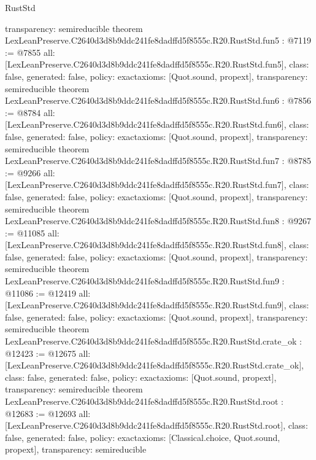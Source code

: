 \begin{lexlean}{RustStd}
\begin{coremodule}
{  transparency: semireducible
}
theorem LexLeanPreserve.C2640d3d8b9ddc241fe8dadffd5f8555c.R20.RustStd.fun5 : @7119 := @7855 {
  all: [LexLeanPreserve.C2640d3d8b9ddc241fe8dadffd5f8555c.R20.RustStd.fun5],
  class: false,
  generated: false,
  policy: exact{axioms: [Quot.sound, propext]},
  transparency: semireducible
}
theorem LexLeanPreserve.C2640d3d8b9ddc241fe8dadffd5f8555c.R20.RustStd.fun6 : @7856 := @8784 {
  all: [LexLeanPreserve.C2640d3d8b9ddc241fe8dadffd5f8555c.R20.RustStd.fun6],
  class: false,
  generated: false,
  policy: exact{axioms: [Quot.sound, propext]},
  transparency: semireducible
}
theorem LexLeanPreserve.C2640d3d8b9ddc241fe8dadffd5f8555c.R20.RustStd.fun7 : @8785 := @9266 {
  all: [LexLeanPreserve.C2640d3d8b9ddc241fe8dadffd5f8555c.R20.RustStd.fun7],
  class: false,
  generated: false,
  policy: exact{axioms: [Quot.sound, propext]},
  transparency: semireducible
}
theorem LexLeanPreserve.C2640d3d8b9ddc241fe8dadffd5f8555c.R20.RustStd.fun8 : @9267 := @11085 {
  all: [LexLeanPreserve.C2640d3d8b9ddc241fe8dadffd5f8555c.R20.RustStd.fun8],
  class: false,
  generated: false,
  policy: exact{axioms: [Quot.sound, propext]},
  transparency: semireducible
}
theorem LexLeanPreserve.C2640d3d8b9ddc241fe8dadffd5f8555c.R20.RustStd.fun9 : @11086 := @12419 {
  all: [LexLeanPreserve.C2640d3d8b9ddc241fe8dadffd5f8555c.R20.RustStd.fun9],
  class: false,
  generated: false,
  policy: exact{axioms: [Quot.sound, propext]},
  transparency: semireducible
}
theorem LexLeanPreserve.C2640d3d8b9ddc241fe8dadffd5f8555c.R20.RustStd.crate_ok : @12423 := @12675 {
  all: [LexLeanPreserve.C2640d3d8b9ddc241fe8dadffd5f8555c.R20.RustStd.crate_ok],
  class: false,
  generated: false,
  policy: exact{axioms: [Quot.sound, propext]},
  transparency: semireducible
}
theorem LexLeanPreserve.C2640d3d8b9ddc241fe8dadffd5f8555c.R20.RustStd.root : @12683 := @12693 {
  all: [LexLeanPreserve.C2640d3d8b9ddc241fe8dadffd5f8555c.R20.RustStd.root],
  class: false,
  generated: false,
  policy: exact{axioms: [Classical.choice, Quot.sound, propext]},
  transparency: semireducible
}


\end{coremodule}
\end{lexlean}
